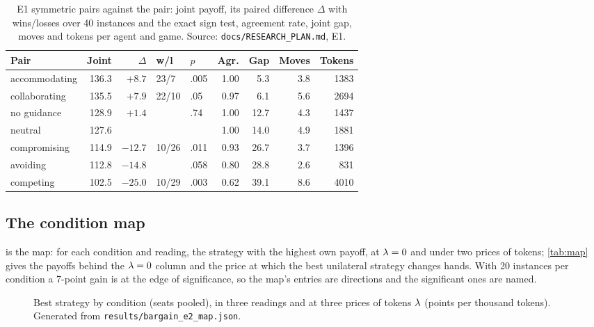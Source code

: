 \begin{table}[t]
\caption{E1 symmetric pairs against the \neutral{} pair: joint payoff, its paired difference $\Delta$ with wins/losses over 40 instances and the exact sign test, agreement rate, joint gap, moves and tokens per agent and game. Source: \texttt{docs/RESEARCH\_PLAN.md}, E1.}
\label{tab:pairs}
\centering\scriptsize\setlength{\tabcolsep}{1.9pt}
\begin{tabular}{@{}l r r l l r r r r@{}}
\toprule
Pair & Joint & $\Delta$ & w/l & $p$ & Agr. & Gap & Moves & Tokens \\
\midrule
accommodating & 136.3 & $+8.7$ & 23/7 & .005 & 1.00 & 5.3 & 3.8 & 1383 \\
collaborating & 135.5 & $+7.9$ & 22/10 & .05 & 0.97 & 6.1 & 5.6 & 2694 \\
no guidance   & 128.9 & $+1.4$ & & .74 & 1.00 & 12.7 & 4.3 & 1437 \\
neutral       & 127.6 & & & & 1.00 & 14.0 & 4.9 & 1881 \\
compromising  & 114.9 & $-12.7$ & 10/26 & .011 & 0.93 & 26.7 & 3.7 & 1396 \\
avoiding      & 112.8 & $-14.8$ & & .058 & 0.80 & 28.8 & 2.6 & 831 \\
competing     & 102.5 & $-25.0$ & 10/29 & .003 & 0.62 & 39.1 & 8.6 & 4010 \\
\bottomrule
\end{tabular}
\end{table}

\subsection{The condition map}
\label{sec:e2}
 is the map: for each condition and reading, the strategy with the highest own payoff, at $\lambda = 0$ and under two prices of tokens; \cref{tab:map} gives the payoffs behind the $\lambda=0$ column and the price at which the best unilateral strategy changes hands. With 20 instances per condition a 7-point gain is at the edge of significance, so the map's entries are directions and the significant ones are named.

\begin{figure}[t]
\centering

\caption{Best strategy by condition (seats pooled), in three readings and at three prices of tokens $\lambda$ (points per thousand tokens). Generated from \texttt{results/bargain\_e2\_map.json}.}
\label{fig:map}
\end{figure}

